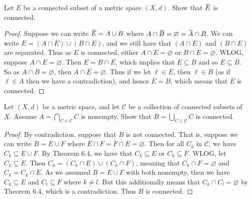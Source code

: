 \documentclass[oneside]{amsart}
\theoremstyle{definition}
\newcommand{\overbar}[1]{\mkern 1.5mu\overline{\mkern-1.5mu#1\mkern-1.5mu}\mkern 1.5mu}
\begin{document}
 
 \begin{tcolorbox}[colback=black!5!white,colframe=black!75!black,title= Chapter $4$; $\S 6.2$: Exercise $6.3.$]  Let $E$ be a connected subset of a metric space $(X, d)$. Show that $\overbar{E}$ is connected.
\tcblower 
\begin{proof} Suppose we can write $\overbar{E} = A \cup B$ where $A \cap \overbar{B} = \varnothing = \overbar {A} \cap B$. We can write $E  = (A \cap E ) \cup (B \cap E)$, and we still have that $(A \cap E)$ and $(B \cap E)$ are separated. Thus as $E$ is connected, either $A \cap E = \varnothing$ or $B \cap E = \varnothing$. WLOG, suppose $A \cap E = \varnothing$. Then $E = B \cap E$, which implies that $E \subseteq B$ and so $\overline{E} \subseteq \overline{B}$. So as $A \cap \overline{B} = \varnothing$, then $A \cap \overline{E} = \varnothing$. Thus if we let $\ell \in \overline{E}$, then $\ell \in B$ (as if $\ell \in A$ then we have a contradiction), and hence $\overline{E} = B$, which means that $\overline{E}$ is connected. 
\end{proof}
\end{tcolorbox}
 \begin{tcolorbox}[colback=black!5!white,colframe=black!75!black,title= Chapter $4$; $\S 6.2$: Exercise $6.4.$]   Let $(X,d)$ be a metric space, and let $\mathcal C$ be a collection of connected subsets of $X$. Assume $A = \bigcap _{C\in \mathcal C} C $ is nonempty. Show that $B =\bigcup _{C\in \mathcal C} C $ is connected.
\tcblower 
\begin{proof} By contradiction, suppose that $B$ is not connected. That is, suppose we can write $B = E \cup F$ where $ \overline{E} \cap F = \overline{F} \cap E = \varnothing$. Then for all $C_k$ in $\mathcal C$, we have $C_k \subseteq E \cup F$. By Theorem 6.4, we have that $C_k \subseteq E$ or $C_k \subseteq F$. WLOG, let $C_k \subseteq E$. Then $C_k = (C_k \cap E) \cup (C_k \cap F)$, meaning that $C_k \cap F = \varnothing$ and $C_k = C_k \cap E$. As we assumed $B = E \cup F$ with both nonempty, then we have $C_k \subseteq E$ and $C_l \subseteq F$ where $k \neq l$. But this additionally means that $C_k \cap C_l  = \varnothing$ by Theorem 6.4, which is a contradiction. Thus $B$ is connected. 
\end{proof}
\end{tcolorbox}
\end{document}
